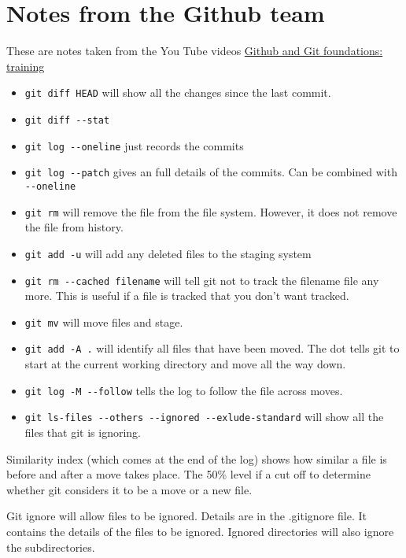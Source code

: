 \documentclass[11pt]{article} %
\begin{document}
\section{Notes from the Github team}
These are notes taken from the You Tube videos \href{https://www.youtube.com/watch?v=WxMFZncm12s&index=4&list=PLg7s6cbtAD15G8lNyoaYDuKZSKyJrgwB-}{Github and Git foundations: training}
\begin{itemize}
\item \lstinline{git diff HEAD} will show all the changes since the last commit. 
\item \lstinline{git diff --stat} 
\item \lstinline{git log --oneline} just records the commits
\item \lstinline{git log --patch} gives an full details of the commits. Can be combined with \lstinline{--oneline}
\item \lstinline{git rm} will remove the file from the file system.  However, it does not remove the file from history. 
\item \lstinline{git add -u} will add any deleted files to the staging system
\item \lstinline{git rm --cached filename} will tell git not to track the filename file any more.  This is useful if a file is tracked that you don't want tracked.  
\item \lstinline{git mv} will move files and stage.
\item  \lstinline{git add -A .} will identify all files that have been moved.  The dot tells git to start at the current working directory and move all the way down.
\item \lstinline{git log -M --follow} tells the log to follow the file across moves. 
\item \lstinline{git ls-files --others --ignored --exlude-standard} will show all the files that git is ignoring. 
\end{itemize}
Similarity index (which comes at the end of the log) shows how similar a file is before and after a move takes place. The 50\% level if a cut off to determine whether git considers it to be a move or a new file. 

Git ignore will allow files to be ignored.  Details are in the .gitignore file.  It contains the details of the files to be ignored. Ignored directories will also ignore the subdirectories. 
\end{document}
